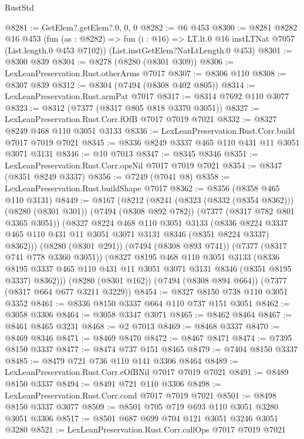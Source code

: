 \begin{lexlean}{RustStd}
\begin{coremodule}
@8281 := GetElem?.getElem?.{0, 0, 0}
@8282 := @6 @453
@8300 := @8281
    @8282
    @16
    @453
    (fun (as : @8282) =>
    fun (i : @16) => LT.lt.{0} @16 instLTNat @7057 (List.length.{0} @453 @7102))
    (List.instGetElem?NatLtLength.{0} @453)
@8301 := @8300 @839
@8304 := @8278 (@8280 (@8301 @309))
@8306 := LexLeanPreservation.Rust.otherArms @7017
@8307 := @8306 @110
@8308 := @8307 @839
@8312 := @8304 (@7494 (@8308 @402 @805))
@8314 := LexLeanPreservation.Rust.armPat @7017
@8317 := @8314 @7692 @110 @3077
@8323 := @8312 (@7377 (@8317 @805 @818 @3370 @3051))
@8327 := LexLeanPreservation.Rust.Corr.fOfB @7017 @7019 @7021
@8332 := @8327 @8249 @468 @110 @3051 @3133
@8336 := LexLeanPreservation.Rust.Corr.build @7017 @7019 @7021
@8345 := @8336 @8249 @3337 @465 @110 @431 @11 @3051 @3071 @3131
@8346 := @10 @7013
@8347 := @8345 @8346
@8351 := LexLeanPreservation.Rust.Corr.opsNil @7017 @7019 @7021
@8354 := @8347 (@8351 @8249 @3337)
@8356 := @7249 (@7041 @8)
@8358 := LexLeanPreservation.Rust.buildShape @7017
@8362 := @8356 (@8358 @465 @110 @3131)
@8449 := @8167
    (@8212
      (@8241
        (@8323 (@8332 (@8354 @8362)))
        (@8280 (@8301 @301))
        (@7494 (@8308 @892 @782))
        (@7377 (@8317 @782 @801 @3365 @3051))
        (@8327
          @8224
          @468
          @110
          @3051
          @3133
          (@8336 @8224 @3337 @465 @110 @431 @11 @3051 @3071 @3131 @8346 (@8351 @8224 @3337) @8362)))
      (@8280 (@8301 @291))
      (@7494 (@8308 @893 @741))
      (@7377 (@8317 @741 @778 @3360 @3051))
      (@8327
        @8195
        @468
        @110
        @3051
        @3133
        (@8336 @8195 @3337 @465 @110 @431 @11 @3051 @3071 @3131 @8346 (@8351 @8195 @3337) @8362)))
    (@8280 (@8301 @162))
    (@7494 (@8308 @894 @664))
    (@7377 (@8317 @664 @677 @3211 @3229))
@8454 := @8327 @8150 @738 @110 @3051 @3352
@8461 := @8336 @8150 @3337 @664 @110 @737 @151 @3051
@8462 := @3058 @3306
@8464 := @3058 @3347 @3071
@8465 := @8462 @8464
@8467 := @8461 @8465 @3231
@8468 := @2 @7013
@8469 := @8468 @3337
@8470 := @8469 @8346
@8471 := @8469 @8470
@8472 := @8467 @8471
@8474 := @7395 @8150 @3337
@8477 := @8474 @737 @151 @8465
@8479 := @7404 @8150 @3337
@8485 := @8479 @721 @736 @110 @141 @3306 @8464
@8489 := LexLeanPreservation.Rust.Corr.eOfBNil @7017 @7019 @7021
@8491 := @8489 @8150 @3337
@8494 := @8491 @721 @110 @3306
@8498 := LexLeanPreservation.Rust.Corr.cond @7017 @7019 @7021
@8501 := @8498 @8150 @3337 @3077
@8509 := @8501 @705 @719 @693 @110 @3051 @3280 @3051 @3306
@8517 := @8501 @687 @699 @704 @121 @3051 @3246 @3051 @3280
@8521 := LexLeanPreservation.Rust.Corr.callOps @7017 @7019 @7021

\end{coremodule}
\end{lexlean}
